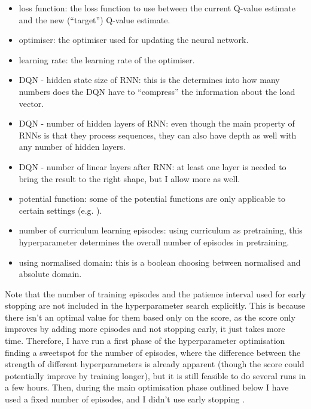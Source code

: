 \begin{itemize}
    \item loss function: the loss function to use between the current Q-value estimate and the new (``target'') Q-value estimate. 
    
    \item optimiser: the optimiser used for updating the neural network. 
    
    \item learning rate: the learning rate of the optimiser. 
    
    \item DQN - hidden state size of RNN: this is the determines into how many numbers does the DQN have to ``compress'' the information about the load vector.
    
    \item DQN - number of hidden layers of RNN: even though the main property of RNNs is that they process sequences, they can also have depth as well with any number of hidden layers.
    
    \item DQN - number of linear layers after RNN: at least one layer is needed to bring the result to the right shape, but I allow more as well.
    
    \item potential function: some of the potential functions are only applicable to certain settings (e.g. \GraphicalTwoChoice).
    
    \item number of curriculum learning episodes: using curriculum as pretraining, this hyperparameter determines the overall number of episodes in pretraining.
    
    \item using normalised domain: this is a boolean choosing between normalised and absolute domain.
    
    


\end{itemize}


Note that the number of training episodes and the patience interval used for early stopping are not included in the hyperparameter search explicitly. This is because there isn't an optimal value for them based only on the score, as the score only improves by adding more episodes and not stopping early, it just takes more time. Therefore, I have run a first phase of the hyperparameter optimisation finding a sweetspot for the number of episodes, where the difference between the strength of different hyperparameters is already apparent (though the score could potentially improve by training longer), but it is still feasible to do several runs in a few hours. Then, during the main optimisation phase outlined below I have used a fixed number of episodes, and I didn't use early stopping .



